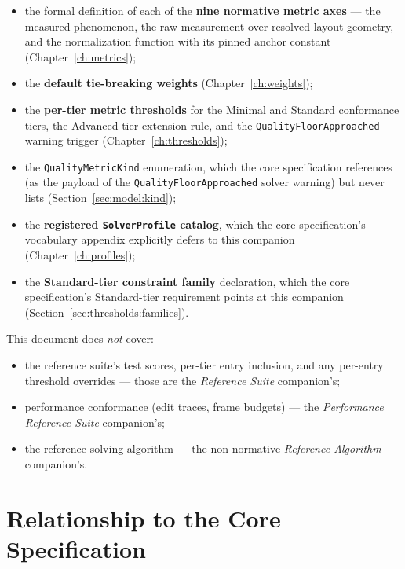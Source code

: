 \documentclass[11pt,letterpaper]{report}
\newcounter{requirement}[chapter]
\begin{document}
\begin{itemize}
  \item the formal definition of each of the \textbf{nine normative metric
    axes} --- the measured phenomenon, the raw measurement over resolved
    layout geometry, and the normalization function with its pinned anchor
    constant (Chapter~\ref{ch:metrics});
  \item the \textbf{default tie-breaking weights}
    (Chapter~\ref{ch:weights});
  \item the \textbf{per-tier metric thresholds} for the Minimal and
    Standard conformance tiers, the Advanced-tier extension rule, and the
    \texttt{QualityFloorApproached} warning trigger
    (Chapter~\ref{ch:thresholds});
  \item the \texttt{QualityMetricKind} enumeration, which the core
    specification references (as the payload of the
    \texttt{QualityFloorApproached} solver warning) but never lists
    (Section~\ref{sec:model:kind});
  \item the \textbf{registered \texttt{SolverProfile} catalog}, which the
    core specification's vocabulary appendix explicitly defers to this
    companion (Chapter~\ref{ch:profiles});
  \item the \textbf{Standard-tier constraint family} declaration, which the
    core specification's Standard-tier requirement points at this companion
    (Section~\ref{sec:thresholds:families}).
\end{itemize}

This document does \emph{not} cover:

\begin{itemize}
  \item the reference suite's test scores, per-tier entry inclusion, and any
    per-entry threshold overrides --- those are the \emph{Reference Suite}
    companion's;
  \item performance conformance (edit traces, frame budgets) --- the
    \emph{Performance Reference Suite} companion's;
  \item the reference solving algorithm --- the non-normative
    \emph{Reference Algorithm} companion's.
\end{itemize}

\section{Relationship to the Core Specification}
\label{sec:about:relationship}
\end{document}
